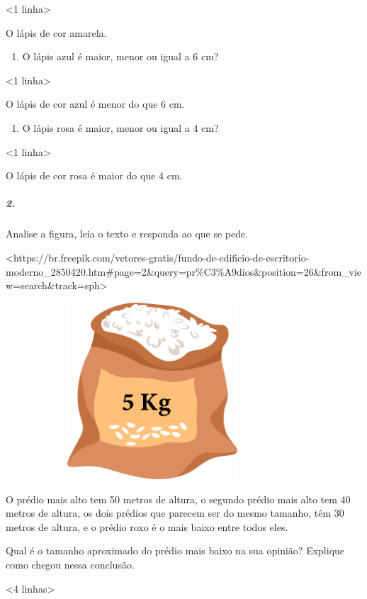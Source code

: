 \textless{}1 linha\textgreater{}

O lápis de cor amarela.

\begin{enumerate}
\def\labelenumi{\alph{enumi})}
\item
  O lápis azul é maior, menor ou igual a 6 cm?
\end{enumerate}

\textless{}1 linha\textgreater{}

O lápis de cor azul é menor do que 6 cm.

\begin{enumerate}
\def\labelenumi{\alph{enumi})}
\item
  O lápis rosa é maior, menor ou igual a 4 cm?
\end{enumerate}

\textless{}1 linha\textgreater{}

O lápis de cor rosa é maior do que 4 cm.

\subparagraph{2.}\label{section-29}

Analise a figura, leia o texto e responda ao que se pede.

\textless{}https://br.freepik.com/vetores-gratis/fundo-de-edificio-de-escritorio-moderno\_2850420.htm\#page=2\&query=pr\%C3\%A9dios\&position=26\&from\_view=search\&track=sph\textgreater{}

\includegraphics[width=4.31250in,height=2.59651in]{media/image43.png}

O prédio mais alto tem 50 metros de altura, o segundo prédio mais alto
tem 40 metros de altura, os dois prédios que parecem ser do mesmo
tamanho, têm 30 metros de altura, e o prédio roxo é o mais baixo entre
todos eles.

Qual é o tamanho aproximado do prédio mais baixo na sua opinião?
Explique como chegou nessa conclusão.

\textless{}4 linhas\textgreater{}

